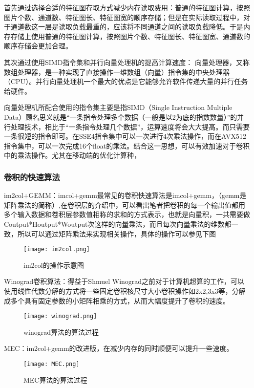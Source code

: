 首先通过选择合适的特征图存取方式减少内存读取费用：普通的特征图计算，按照图片个数、通道数、特征图长、特征图宽的顺序存储；但是在实际读取过程中，对于通道数这一层是读取负载最重的，应该将不同通道之间的读取负载降低。于是内存存储上使用普通的特征图计算，按照图片个数、特征图长、特征图宽、通道数的顺序存储会更加合理。

其次通过使用SIMD指令集和并行向量处理机的提高计算速度：
向量处理器，又称数组处理器，是一种实现了直接操作一维数组（向量）指令集的中央处理器（CPU）。并行向量处理机一个最大的优点是它能够允许软件传递大量的并行任务给硬件。

向量处理机所配合使用的指令集主要是指SIMD（Single Instruction Multiple Data）顾名思义就是“一条指令处理多个数据（一般是以2为底的指数数量）”的并行处理技术，相比于“一条指令处理几个数据”，运算速度将会大大提高。而只需要一条很短的指令即可。在SSE4指令集中可以一次进行4次乘法操作，而在AVX512指令集中，可以一次完成16个float的乘法。结合这一思想，可以有效加速对于卷积中的乘法操作。尤其在移动端的优化计算种，
\subsubsection{卷积的快速算法}
im2col+GEMM\cite{CAFFE}：imcol+gemm最常见的卷积快速算法是imcol+gemm，（gemm是矩阵乘法的简称）,在卷积层的介绍中，可以看出笔者把卷积的每一个输出值都用多个输入数据和卷积层参数值相称的求和的方式表示，也就是向量积，一共需要做Coutput*Houtput*Woutput次这样的向量乘法，而且每次向量乘法的维数都一致，所以可以通过矩阵乘法来实现相关操作，具体的操作可以参见下图
\begin{figure}[!ht]
 \centering
	\texttt{[image: im2col.png]}
	\caption{im2col的操作示意图}
\end{figure}

Winograd卷积算法\cite{WINOGRAD}：得益于Shmuel Winograd之前对于计算机超算的工作，可以使用线性代数分解的方式将一些固定卷积核尺寸大小卷积操作如2x2,3x3等，分解成多个具有固定参数的小矩阵相乘的方式，从而大幅度提升了卷积的速度。
\begin{figure}[!ht]
 \centering
	\texttt{[image: winograd.png]}
	\caption{winograd算法的算法过程}
\end{figure}

MEC\cite{MEC}：im2col+gemm的改进版，在减少内存的同时顺便可以提升一些速度。
\begin{figure}[!ht]
 \centering
	\texttt{[image: MEC.png]}
	\caption{MEC算法的算法过程}
\end{figure}

